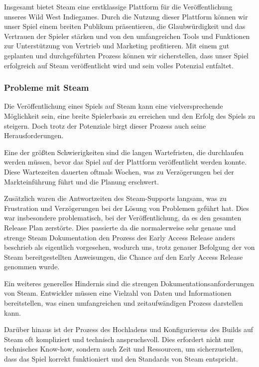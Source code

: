 Insgesamt bietet Steam eine erstklassige Plattform für die Veröffentlichung unseres Wild West Indiegames.
Durch die Nutzung dieser Plattform können wir unser Spiel einem breiten Publikum präsentieren, die Glaubwürdigkeit und das Vertrauen der Spieler stärken und von den
umfangreichen Tools und Funktionen zur Unterstützung von Vertrieb und Marketing profitieren.
Mit einem gut geplanten und durchgeführten Prozess können wir sicherstellen, dass unser Spiel erfolgreich auf Steam veröffentlicht wird und sein volles Potenzial entfaltet.

 \subsubsection{Probleme mit Steam}\label{subsubsec:Steam-Herausforderungen}
Die Veröffentlichung eines Spiels auf Steam kann eine vielversprechende Möglichkeit sein, eine breite Spielerbasis zu erreichen und den Erfolg des Spiels zu steigern. Doch trotz der Potenziale birgt dieser Prozess auch seine Herausforderungen.

Eine der größten Schwierigkeiten sind die langen Wartefristen, die durchlaufen werden müssen, bevor das Spiel auf der Plattform veröffentlicht werden konnte. Diese Wartezeiten dauerten oftmals Wochen, was zu Verzögerungen bei der Markteinführung führt und die Planung erschwert.

Zusätzlich waren die Antwortzeiten des Steam-Supports langsam, was zu Frustration und Verzögerungen bei der Lösung von Problemen geführt hat. Dies war insbesondere problematisch, bei der Veröffentlichung, da es den gesamten Release Plan zerstörte.
Dies passierte da die normalerweise sehr genaue und strenge Steam Dokumentation den Prozess des Early Access Release anders beschrieb als eigentlich vorgesehen, wodurch uns, trotz genauer Befolgung der von Steam bereitgestellten Anweisungen, die Chance auf den Early Access Release genommen wurde.

Ein weiteres generelles Hindernis sind die strengen Dokumentationsanforderungen von Steam. Entwickler müssen eine Vielzahl von Daten und Informationen bereitstellen, was einen umfangreichen und zeitaufwändigen Prozess darstellen kann.

Darüber hinaus ist der Prozess des Hochladens und Konfigurierens des Builds auf Steam oft kompliziert und technisch anspruchsvoll. Dies erfordert nicht nur technisches Know-how, sondern auch Zeit und Ressourcen, um sicherzustellen, dass das Spiel korrekt funktioniert und den Standards von Steam entspricht.

